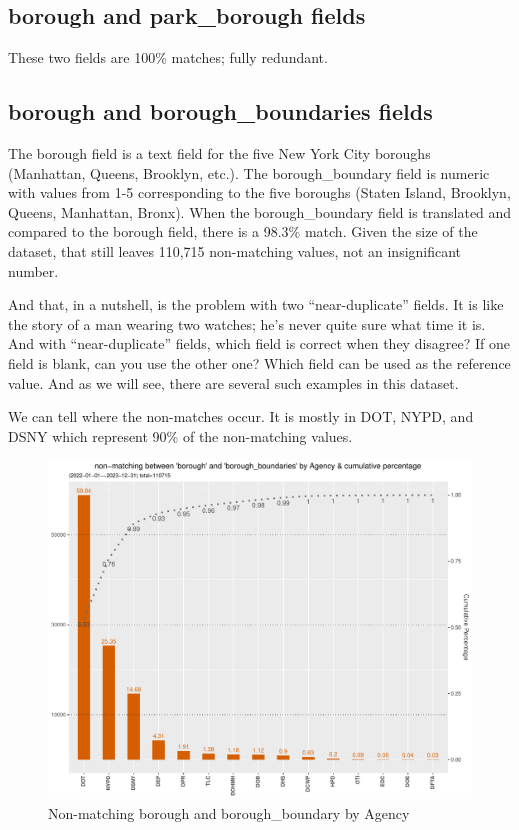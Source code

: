 \documentclass[12pt, titlepage]{article}
\begin{document}
{\subsection{borough and park\_borough fields}  These two fields are 100\% matches; fully redundant.

\subsection{borough and borough\_boundaries fields}  The borough field is a text field for the five New York City boroughs (Manhattan, Queens, Brooklyn, etc.).
The borough\_boundary field is numeric with values from 1-5 corresponding to the five boroughs (Staten Island, Brooklyn, Queens, Manhattan, Bronx).
When the borough\_boundary field is translated and compared to the borough field, there is a 98.3\% match. Given the size of the dataset, that 
still leaves 110,715 non-matching values, not an insignificant number.  

And that, in a nutshell, is the problem with two ``near-duplicate'' fields. It is like the  story of a man wearing two watches; he's never
quite sure what time it is. And with ``near-duplicate'' fields, which field is correct when they disagree? 
If one field is blank, can you use the other one? Which field can be used as the reference value.
 And as we will see, there are several such examples in this dataset.

We can tell where the non-matches occur. It is mostly in DOT, NYPD, and DSNY which represent 90\% of the non-matching values.

	\begin{figure}[tbp]
		\centering
		\includegraphics[width = \textwidth]{non_matching_borough_boundaries_chart.pdf}
		\caption{Non-matching borough and borough\_boundary by Agency}
		\label{fig:borough-boundaries}
	\end{figure}	
	
}
\end{document}
